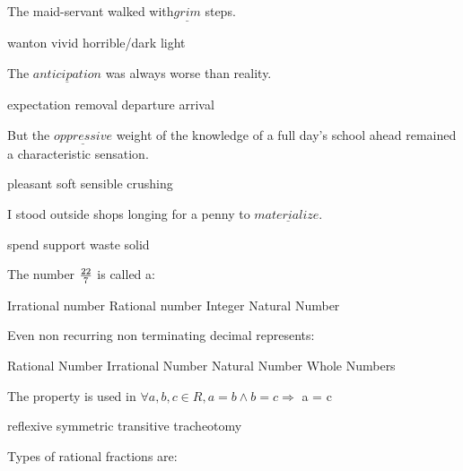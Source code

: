 \documentclass{exam}
\begin{document}
\begin{questions}
The maid-servant walked with\(\underline{grim}\) steps.\\
\begin{oneparchoices}
\choice wanton
\choice vivid
\choice horrible/dark
\choice light
\end{oneparchoices}
\question 

The \(\underline{anticipation}\) was always worse than reality.\\
\begin{oneparchoices}
\choice expectation
\choice removal
\choice departure
\choice arrival
\end{oneparchoices}
\question 

But the \(\underline{oppressive}\) weight of the knowledge of a full day's school ahead remained a characteristic sensation.\\
\begin{oneparchoices}
\choice pleasant
\choice soft
\choice sensible
\choice crushing
\end{oneparchoices}
\question 

I stood outside shops longing for a penny to \(\underline{materialize.}\)\\
\begin{oneparchoices}
\choice spend
\choice support
\choice waste
\choice solid
\end{oneparchoices}
\question 

The number \(22\over7\) is called a:\\
\begin{oneparchoices}
\choice Irrational number
\choice Rational number
\choice Integer
\choice Natural Number
\end{oneparchoices}
\question 

Even non recurring non terminating decimal represents:\\
\begin{oneparchoices}
\choice Rational Number
\choice Irrational Number
\choice Natural Number
\choice Whole Numbers
\end{oneparchoices}
\question 

The property is used in \(\forall  a,b,c  \in R ,a = b  \land b= c\Rightarrow \) a = c\\
\begin{oneparchoices}
\choice reflexive
\choice symmetric
\choice transitive
\choice tracheotomy
\end{oneparchoices}
\question 

Types of rational fractions are:\\
\begin{oneparchoices}
\end{oneparchoices}
\question 


\end{questions}
\end{document}

